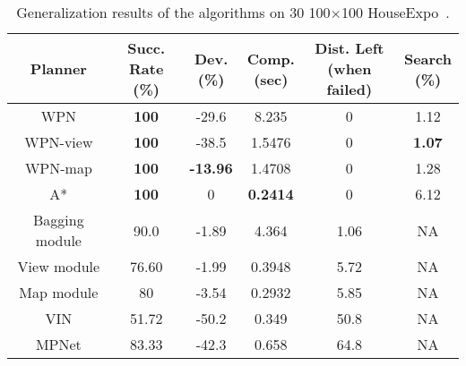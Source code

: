 \documentclass[journal, twocolumn]{IEEEtran}
\begin{document}
\begin{table}[]
    \centering
    \caption{Generalization results of the algorithms on 30 100$\times$100 HouseExpo~\cite{houseexpo}.}
            \vspace{-2 mm}
            
    \begin{tabular}{@{}c|c|c|c|c|c@{}}
                \toprule
       \textbf{\scriptsize Planner} & \makecell {\textbf{\scriptsize Succ. } \\ \textbf{\scriptsize Rate (\%)} } & \makecell {\textbf{\scriptsize Dev.} \\ \textbf{\scriptsize }{\scriptsize (\%)} } & \makecell {\textbf{\scriptsize Comp.} \\ (sec) } &  \makecell{\textbf{\scriptsize Dist. Left} \\ \scriptsize{(when failed)} } & \makecell {\textbf{\scriptsize Search} \\ \textbf{\scriptsize (\%)} }  \\
       \hline
       {\scriptsize WPN}              & {\bf 100} & -29.6 & 8.235 & 0 & 1.12 \\
        {\scriptsize WPN-view}             & {\bf 100} & -38.5 & 1.5476 & 0 & {\bf 1.07} \\
        {\scriptsize WPN-map}              & {\bf 100} & {\bf -13.96} & 1.4708 & 0 & 1.28 \\
       \hline
       {\scriptsize A*}               & {\bf 100} & 0 & {\bf 0.2414} & 0 & 6.12 \\
       \hline
       {\scriptsize Bagging module}   & 90.0 & -1.89 & 4.364 & 1.06 & NA \\
       {\scriptsize View module \cite{nicola2018lstm}} & 76.60 & -1.99  & 0.3948 & 5.72 & NA \\
       {\scriptsize Map module \cite{inoue2019robot}} & 80 & -3.54 & 0.2932 & 5.85 & NA \\
       \hline
       {\scriptsize VIN \cite{tamar2016value}} & 51.72 & -50.2 & 0.349 & 50.8 & NA \\
       \hline
       {\scriptsize MPNet \cite{qureshi2019motion}} & 83.33 & -42.3&  0.658& 64.8 & NA \\
       \bottomrule
    \end{tabular}
    \label{tab:houseexpo}
        \vspace{-2 mm}
\end{table}
\end{document}
